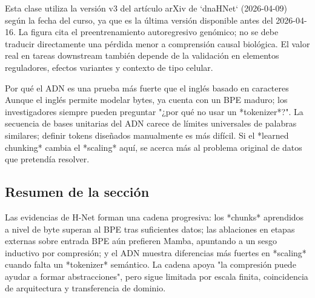 Esta clase utiliza la versión v3 del artículo arXiv de `dnaHNet` (2026-04-09) según la fecha del curso, ya que es la última versión disponible antes del 2026-04-16. La figura cita el preentrenamiento autoregresivo genómico; no se debe traducir directamente una pérdida menor a comprensión causal biológica. El valor real en tareas downstream también depende de la validación en elementos reguladores, efectos variantes y contexto de tipo celular.

\begin{knowledgebox}{Por qué el ADN es una prueba más fuerte que el inglés basado en caracteres}
Aunque el inglés permite modelar bytes, ya cuenta con un BPE maduro; los investigadores siempre pueden preguntar "¿por qué no usar un *tokenizer*?". La secuencia de bases unitarias del ADN carece de límites universales de palabras similares; definir tokens diseñados manualmente es más difícil. Si el *learned chunking* cambia el *scaling* aquí, se acerca más al problema original de datos que pretendía resolver.
\end{knowledgebox}


\subsection{Resumen de la sección}

Las evidencias de H-Net forman una cadena progresiva: los *chunks* aprendidos a nivel de byte superan al BPE tras suficientes datos; las ablaciones en etapas externas sobre entrada BPE aún prefieren Mamba, apuntando a un sesgo inductivo por compresión; y el ADN muestra diferencias más fuertes en *scaling* cuando falta un *tokenizer* semántico. La cadena apoya "la compresión puede ayudar a formar abstracciones", pero sigue limitada por escala finita, coincidencia de arquitectura y transferencia de dominio.
